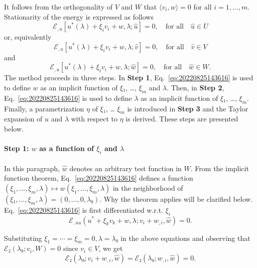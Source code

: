 \documentclass[12pt, final]{scrartcl}
\theoremstyle{definition}
\newcommand{\wrt}{w.r.t.}
\begin{document}
It follows from the orthogonality of \(V\) and \(W\) that \(〈v_i, w〉 = 0\) for
all \(i=1, \ldots, m\). Stationarity of the energy is expressed as follows
\begin{equation}
  ℰ_{,u}[u^\ast(λ) + ξ_i v_i + w, λ; \hat{u}] = 0, \quad \text{for all} \quad \hat{u} ∈ U
\end{equation}
or, equivalently
\begin{equation}
  \label{eq:20220901120544}
  ℰ_{,u}[u^\ast(λ) + ξ_i v_i + w, λ; \hat{v}] = 0, \quad \text{for all} \quad \hat{v} ∈ V
\end{equation}
and
\begin{equation}
  \label{eq:20220825143616}
  ℰ_{,u}[u^\ast(λ) + ξ_i v_i + w, λ; \hat{w}] = 0, \quad \text{for all} \quad \hat{w} ∈ W.
\end{equation}
The method proceeds in three steps. In \textbf{Step 1},
Eq.~\eqref{eq:20220825143616} is used to define \(w\) as an implicit function of
\(ξ₁\), \dots, \(ξ_m\) and \(λ\). Then, in \textbf{Step 2},
Eq.~\eqref{eq:20220825143616} is used to define \(λ\) as an implicit function of
\(ξ₁\), \dots, \(ξ_m\). Finally, a parametrization \(η\) of \(ξ₁\), \dots
\(ξ_m\) is introduced in \textbf{Step 3} and the Taylor expansion of \(u\) and
\(λ\) with respect to \(η\) is derived. These steps are presented below.

\paragraph{Step 1: \(w\) as a function of \(ξ_i\) and \(λ\)} In this paragraph,
\(\hat{w}\) denotes an arbitrary test function in \(W\). From the implicit
function theorem, Eq.~\eqref{eq:20220825143616} defines a function
\((ξ_1, \ldots, ξ_m, λ) \mapsto w(ξ_1, \ldots, ξ_m, λ)\) in the neighborhood of
\((ξ₁, \ldots, ξ_m, λ) = (0, \ldots, 0, λ₀)\). Why the theorem applies will be
clarified below. Eq.~\eqref{eq:20220825143616} is first differentiated \wrt{}
\(ξ_i\)
\begin{equation}
  \label{eq:20220826140926}
  ℰ_{,uu}(u^\ast + ξ_k v_k + w, λ; v_i + w_{,i}, \hat{w}) = 0.
\end{equation}

Substituting \(ξ_1 = \cdots = ξ_m = 0, λ = λ₀\) in the above equations and
observing that \(ℰ₂(λ₀; v_i, W) = 0\) since \(v_i ∈ V\), we get
\begin{equation}
\label{eq:20220825150219}
  ℰ₂(λ₀; v_i + w_{,i}, \hat{w}) = ℰ₂(λ₀; w_{,i}, \hat{w}) = 0.
\end{equation}
\end{document}

